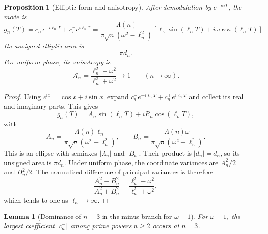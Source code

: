 \documentclass[11pt]{amsart}
\numberwithin{equation}{section}
\theoremstyle{plain}
\newtheorem{proposition}[theorem]{Proposition}
\newtheorem{lemma}[theorem]{Lemma}
\theoremstyle{definition}
\theoremstyle{remark}
\newcommand{\1}{\mathbf{1}}
\begin{document}
\begin{proposition}[Elliptic form and anisotropy]
\label{prop:ellipse_anisotropy}
After demodulation by \(e^{-i\omega T}\), the mode is
\begin{equation}
g_n(T)
=
c_n^-e^{-i\ell_nT}
+
c_n^+e^{i\ell_nT}
=
\frac{\Lambda(n)}
{\pi\sqrt n(\omega^2-\ell_n^2)}
\left[
\ell_n\sin(\ell_nT)
+
i\omega\cos(\ell_nT)
\right].
\label{eq:gn_ellipse}
\end{equation}
Its unsigned elliptic area is
\begin{equation}
\pi d_n.
\label{eq:ellipse_area}
\end{equation}
For uniform phase, its anisotropy is
\begin{equation}
\mathcal A_n
=
\frac{\ell_n^2-\omega^2}{\ell_n^2+\omega^2}
\longrightarrow1
\qquad(n\to\infty).
\label{eq:single_mode_anisotropy}
\end{equation}
\end{proposition}

\begin{proof}
Using \(e^{ix}=\cos x+i\sin x\), expand
\(c_n^-e^{-i\ell_nT}+c_n^+e^{i\ell_nT}\) and collect its real and
imaginary parts.  This gives
\begin{equation}
g_n(T)=A_n\sin(\ell_nT)+iB_n\cos(\ell_nT),
\label{eq:ellipse_parametric_proof}
\end{equation}
with
\begin{equation}
A_n=
\frac{\Lambda(n)\ell_n}{\pi\sqrt n(\omega^2-\ell_n^2)},
\qquad
B_n=
\frac{\Lambda(n)\omega}{\pi\sqrt n(\omega^2-\ell_n^2)}.
\label{eq:ellipse_axes_proof}
\end{equation}
This is an ellipse with semiaxes \(|A_n|\) and \(|B_n|\).  Their product
is \(|d_n|=d_n\), so its unsigned area is \(\pi d_n\).  Under uniform
phase, the coordinate variances are \(A_n^2/2\) and \(B_n^2/2\).  The
normalized difference of principal variances is therefore
\begin{equation}
\frac{A_n^2-B_n^2}{A_n^2+B_n^2}
=
\frac{\ell_n^2-\omega^2}{\ell_n^2+\omega^2},
\label{eq:anisotropy_proof_ratio}
\end{equation}
which tends to one as \(\ell_n\to\infty\).
\end{proof}

\begin{lemma}[Dominance of \(n=3\) in the minus branch for \(\omega=1\)]
\label{lem:n3_dominance}
For \(\omega=1\), the largest coefficient
\(|c_n^-|\) among prime powers \(n\geq2\) occurs at \(n=3\).
\end{lemma}
\end{document}
